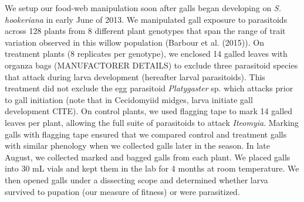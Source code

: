 \documentclass[]{elsarticle} %
\begin{document}
We setup our food-web manipulation soon after galls began developing on
\emph{S. hookeriana} in early June of 2013. We manipulated gall exposure
to parasitoids across 128 plants from 8 different plant genotypes that
span the range of trait variation observed in this willow population
(Barbour et al. (2015)). On treatment plants (8 replicates per
genotype), we enclosed 14 galled leaves with organza bags (MANUFACTORER
DETAILS) to exclude three parasitoid species that attack during larva
development (hereafter larval parasitoids). This treatment did not
exclude the egg parasitoid \emph{Platygaster} sp. which attacks prior to
gall initiation (note that in Cecidomyiid midges, larva initiate gall
development CITE). On control plants, we used flagging tape to mark 14
galled leaves per plant, allowing the full suite of parasitoids to
attack \emph{Iteomyia}. Marking galls with flagging tape ensured that we
compared control and treatment galls with similar phenology when we
collected galls later in the season. In late August, we collected marked
and bagged galls from each plant. We placed galls into 30 mL vials and
kept them in the lab for 4 months at room temperature. We then opened
galls under a dissecting scope and determined whether larva survived to
pupation (our measure of fitness) or were parasitized.
\end{document}
